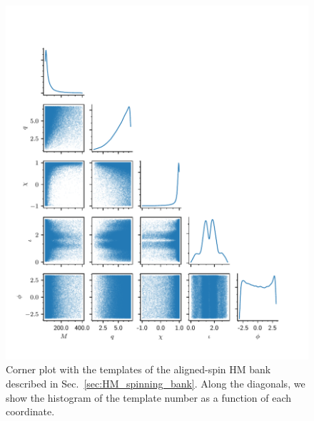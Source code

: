 \documentclass[twocolumn,showpacs,preprintnumbers,nofootinbib,prd,
superscriptaddress,10pt]{revtex4-2}
\begin{document}
\begin{figure}
	\centering
	\includegraphics[scale = 1.]{corner_HM_spinning}
	\caption{Corner plot with the templates of the aligned-spin HM bank described in Sec.~\ref{sec:HM_spinning_bank}. Along the diagonals, we show the histogram of the template number as a function of each coordinate.}
	\label{fig:corner_HM_spinning}
\end{figure}

	
	
\end{document}
